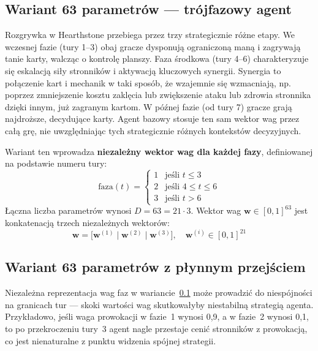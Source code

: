 \subsection{Wariant 63 parametrów --- trójfazowy agent}
\label{sec:agent63}

Rozgrywka w Hearthstone przebiega przez trzy strategicznie różne etapy. We wczesnej fazie (tury 1--3) obaj gracze dysponują ograniczoną maną i zagrywają tanie karty, walcząc o kontrolę planszy. Faza środkowa (tury 4--6) charakteryzuje się eskalacją siły stronników i aktywacją kluczowych synergii. Synergia to połączenie kart i mechanik w taki sposób, że wzajemnie się wzmacniają, np. poprzez zmniejszenie kosztu zaklęcia lub zwiększenie ataku lub zdrowia stronnika dzięki innym, już zagranym kartom. W późnej fazie (od tury 7) gracze grają najdroższe, decydujące karty. Agent bazowy stosuje ten sam wektor wag przez całą grę, nie uwzględniając tych strategicznie różnych kontekstów decyzyjnych.

Wariant ten wprowadza \textbf{niezależny wektor wag dla każdej fazy}, definiowanej na podstawie numeru tury:
\begin{equation}
    \text{faza}(t) =
    \begin{cases}
        1 & \text{jeśli } t \leq 3 \\
        2 & \text{jeśli } 4 \leq t \leq 6 \\
        3 & \text{jeśli } t > 6
    \end{cases}
    \label{eq:phase}
\end{equation}
Łączna liczba parametrów wynosi $D = 63 = 21 \cdot 3$. Wektor wag $\mathbf{w} \in [0,1]^{63}$ jest konkatenacją trzech niezależnych wektorów:
\begin{equation}
    \mathbf{w} = \bigl[\mathbf{w}^{(1)} \mid \mathbf{w}^{(2)}
    \mid \mathbf{w}^{(3)}\bigr], \quad \mathbf{w}^{(i)} \in [0,1]^{21}
\end{equation}

\subsection{Wariant 63 parametrów z płynnym przejściem}
\label{sec:agent63smooth}

Niezależna reprezentacja wag faz w wariancie~\ref{sec:agent63} może prowadzić do niespójności na granicach tur --- skoki wartości wag skutkowałyby niestabilną strategią agenta. Przykładowo, jeśli waga prowokacji w fazie~1 wynosi 0,9, a w fazie~2 wynosi 0,1, to po przekroczeniu tury~3 agent nagle przestaje cenić stronników z prowokacją, co jest nienaturalne z punktu widzenia spójnej strategii.

